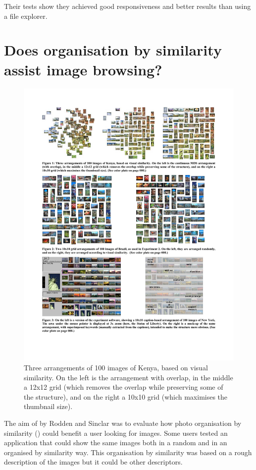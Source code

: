 Their tests show they achieved good responsiveness and better results than using a file explorer.


\section{Does organisation by similarity assist image browsing?} %
\label{sub:Rodden}
\begin{figure}[ht]
	\centering
		\includegraphics[width=\textwidth]{imgs-RelatedWork/Rodden1}
	\caption{Three arrangements of 100 images of Kenya, based on visual similarity. On the left is the arrangement with overlap, in the middle a 12x12 grid (which removes the overlap while preserving some of the structure), and on the right a 10x10 grid (which maximises the thumbnail size).}
	\label{fig:Rodden1}
\end{figure}

The aim of \cite{Rodden:2001p731} by Rodden and Sinclar was to evaluate how photo organisation by similarity () could benefit a user looking for images. Some users tested an application that could show the same images both in a random and in an organised by similarity way. This organisation by similarity was based on a rough description of the images but it could be other descriptors.

